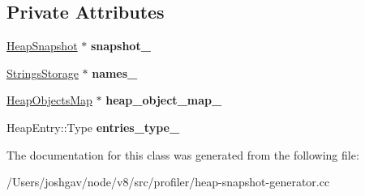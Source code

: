 \subsection*{Private Attributes}
\begin{DoxyCompactItemize}
\item 
\hyperlink{classv8_1_1internal_1_1_heap_snapshot}{Heap\+Snapshot} $\ast$ {\bfseries snapshot\+\_\+}\hypertarget{classv8_1_1internal_1_1_basic_heap_entries_allocator_aebffc8df8b5aa8865f6de5db673b90f5}{}\label{classv8_1_1internal_1_1_basic_heap_entries_allocator_aebffc8df8b5aa8865f6de5db673b90f5}

\item 
\hyperlink{classv8_1_1internal_1_1_strings_storage}{Strings\+Storage} $\ast$ {\bfseries names\+\_\+}\hypertarget{classv8_1_1internal_1_1_basic_heap_entries_allocator_a5813dc5ad36b83e6e721a47535aa5f87}{}\label{classv8_1_1internal_1_1_basic_heap_entries_allocator_a5813dc5ad36b83e6e721a47535aa5f87}

\item 
\hyperlink{classv8_1_1internal_1_1_heap_objects_map}{Heap\+Objects\+Map} $\ast$ {\bfseries heap\+\_\+object\+\_\+map\+\_\+}\hypertarget{classv8_1_1internal_1_1_basic_heap_entries_allocator_a416dfd8d68f2d6b2e825147734378b09}{}\label{classv8_1_1internal_1_1_basic_heap_entries_allocator_a416dfd8d68f2d6b2e825147734378b09}

\item 
Heap\+Entry\+::\+Type {\bfseries entries\+\_\+type\+\_\+}\hypertarget{classv8_1_1internal_1_1_basic_heap_entries_allocator_a9d0985c93e81e5afa14f9568c017b4b6}{}\label{classv8_1_1internal_1_1_basic_heap_entries_allocator_a9d0985c93e81e5afa14f9568c017b4b6}

\end{DoxyCompactItemize}


The documentation for this class was generated from the following file\+:\begin{DoxyCompactItemize}
\item 
/\+Users/joshgav/node/v8/src/profiler/heap-\/snapshot-\/generator.\+cc\end{DoxyCompactItemize}
